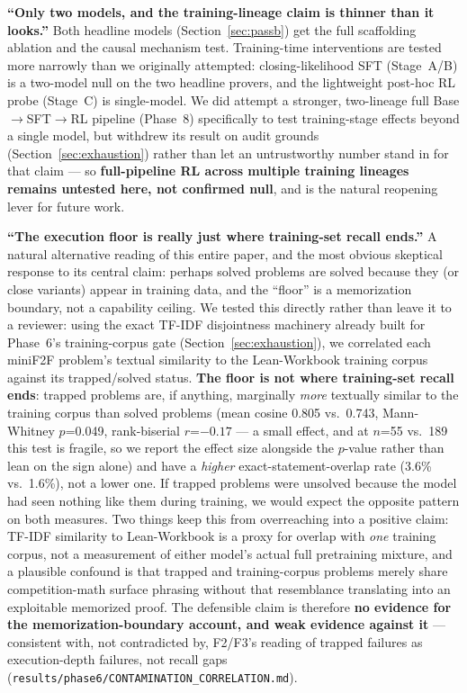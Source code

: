 \documentclass{article}
\begin{document}
\textbf{``Only two models, and the training-lineage claim is thinner than it looks.''} Both headline
models (Section~\ref{sec:passb}) get the full scaffolding ablation and the causal mechanism test.
Training-time interventions are tested more narrowly than we originally attempted: closing-likelihood
SFT (Stage~A/B) is a two-model null on the two headline provers, and the lightweight post-hoc RL probe
(Stage~C) is single-model. We did attempt a stronger, two-lineage full Base$\to$SFT$\to$RL pipeline
(Phase~8) specifically to test training-stage effects beyond a single model, but withdrew its result on
audit grounds (Section~\ref{sec:exhaustion}) rather than let an untrustworthy number stand in for that
claim --- so \textbf{full-pipeline RL across multiple training lineages remains untested here, not
confirmed null}, and is the natural reopening lever for future work.

\textbf{``The execution floor is really just where training-set recall ends.''} A natural alternative
reading of this entire paper, and the most obvious skeptical response to its central claim: perhaps
solved problems are solved because they (or close variants) appear in training data, and the ``floor''
is a memorization boundary, not a capability ceiling. We tested this directly rather than leave it to a
reviewer: using the exact TF-IDF disjointness machinery already built for Phase~6's training-corpus
gate (Section~\ref{sec:exhaustion}), we correlated each miniF2F problem's textual similarity to the
Lean-Workbook training corpus against its trapped/solved status. \textbf{The floor is not where
training-set recall ends}: trapped problems are, if anything, marginally \emph{more} textually similar
to the training corpus than solved problems (mean cosine 0.805 vs.\ 0.743, Mann-Whitney $p$=0.049,
rank-biserial $r$=$-0.17$ --- a small effect, and at $n$=55 vs.\ 189 this test is fragile, so we report
the effect size alongside the $p$-value rather than lean on the sign alone) and have a \emph{higher}
exact-statement-overlap rate (3.6\% vs.\ 1.6\%), not a lower one. If trapped problems were unsolved
because the model had seen nothing like them during training, we would expect the opposite pattern on
both measures. Two things keep this from overreaching into a positive claim: TF-IDF similarity to
Lean-Workbook is a proxy for overlap with \emph{one} training corpus, not a measurement of either
model's actual full pretraining mixture, and a plausible confound is that trapped and training-corpus
problems merely share competition-math surface phrasing without that resemblance translating into an
exploitable memorized proof. The defensible claim is therefore \textbf{no evidence for the
memorization-boundary account, and weak evidence against it} --- consistent with, not contradicted by,
F2/F3's reading of trapped failures as execution-depth failures, not recall gaps
(\texttt{results/phase6/CONTAMINATION\_CORRELATION.md}).
\end{document}
